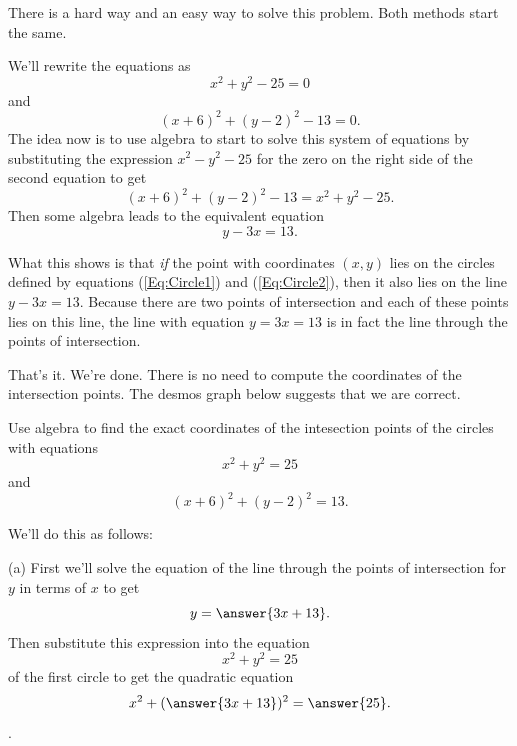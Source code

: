 \documentclass{ximera}
\begin{document}
\begin{explanation}

There is a hard way and an easy way to solve this problem. Both methods start the same.

We'll rewrite the equations as
\begin{equation}
  x^2 + y^2 - 25 = 0   \label{Eq:Circle1}
\end{equation}
and
\begin{equation}
  (x+6)^2 + (y-2)^2-13 = 0 .   \label{Eq:Circle2}
\end{equation}
The idea now is to use algebra to start to solve this system of equations by substituting the expression $x^2-y^2-25$ for the zero on the right side of the second equation to get
\[
        (x+6)^2 + (y-2)^2-13 = x^2 + y^2 -25 .
\]
Then some algebra leads to the equivalent equation
\[
   y-3x = 13.
\]

What this shows is that \emph{if} the point with coordinates $(x,y)$ lies on the circles defined by equations (\ref{Eq:Circle1}) and (\ref{Eq:Circle2}), then it also lies on the line $y-3x = 13$. Because there are two points of intersection and each of these points lies on this line, the line with equation $y=3x=13$ is in fact the line through the points of intersection.

That's it. We're done. There is no need to compute the coordinates of the intersection points. The desmos graph below suggests that we are correct.

\begin{onlineOnly}
    \begin{center}
\end{center}
\end{onlineOnly}


\begin{question}  \label{Q435rrtnhgh}
Use algebra to find the exact coordinates of the intesection points of the circles with equations
\[
    x^2 + y^2 = 25
\]
and 
\[
   (x+6)^2 + (y-2)^2=13 .
\]

We'll do this as follows:

(a) First we'll solve the equation of the line through the points of intersection for $y$ in terms of $x$ to get
\[
     y = \answer{3x+13}.
\]
Then substitute this expression into the equation
\[
   x^2 + y^2 = 25
\]
of the first circle to get the quadratic equation
\[
        x^2 + (\answer{3x+13})^2 = \answer{25}. 
\]. 


\end{question}
\end{explanation}
\end{document}

